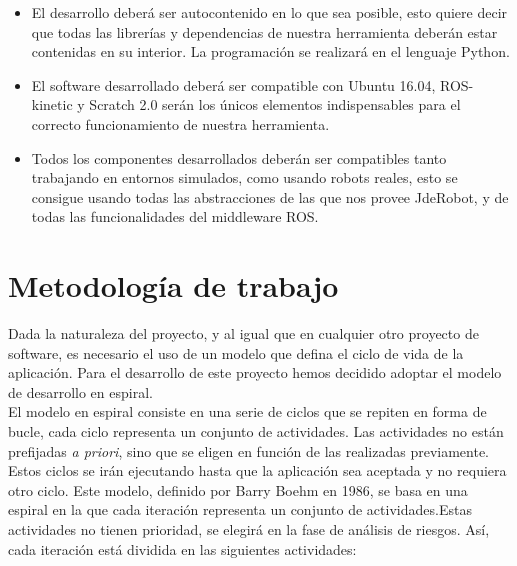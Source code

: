 \begin{itemize}
\item El desarrollo deberá ser autocontenido en lo que sea posible, esto quiere decir que todas las librerías y dependencias de nuestra herramienta deberán estar contenidas en su interior. La programación se realizará en el
lenguaje Python.
\item El software desarrollado deberá ser compatible con Ubuntu 16.04, ROS-kinetic y Scratch 2.0 serán los únicos elementos indispensables para el correcto funcionamiento de nuestra herramienta.
\item Todos los componentes desarrollados deberán ser compatibles tanto trabajando en entornos simulados, como usando robots reales, esto se consigue usando todas las abstracciones de las que nos provee JdeRobot, y de todas las funcionalidades del middleware ROS.
\end{itemize}



\section{Metodología de trabajo}
\label{sec:metodologia}

Dada la naturaleza del proyecto, y al igual que en cualquier otro proyecto de software, es necesario el uso de un modelo que defina el ciclo de vida de la aplicación. Para el desarrollo de este proyecto hemos decidido adoptar el modelo de desarrollo en espiral.\\

El modelo en espiral consiste en una serie de ciclos que se repiten en forma de
bucle, cada ciclo representa un conjunto de actividades. Las actividades no están
prefijadas \textit{a priori}, sino que se eligen en función de las realizadas previamente. Estos ciclos se irán ejecutando hasta que la aplicación sea aceptada y no requiera otro
ciclo. Este modelo, definido por Barry Boehm en 1986, se basa en una espiral en la que cada iteración representa un conjunto de actividades.Estas actividades no tienen prioridad, se elegirá en la fase de análisis de riesgos. Así, cada iteración está dividida en las siguientes actividades:

